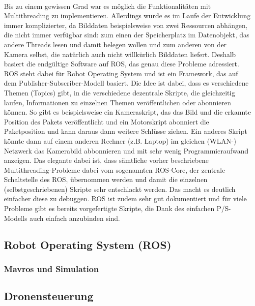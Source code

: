 \paragraph{}
Bis zu einem gewissen Grad war es möglich die Funktionalitäten mit Multithreading zu
implementieren. Allerdings wurde es im Laufe der Entwicklung immer komplizierter, da
Bilddaten beispielsweise von zwei Ressourcen abhängen, die nicht immer verfügbar
sind: zum einen der Speicherplatz im Datenobjekt, das andere Threads lesen und
damit belegen wollen und zum anderen von der Kamera selbst, die natürlich auch nicht
willkürlich Bilddaten liefert. Deshalb basiert die endgültige Software auf ROS, das
genau diese Probleme adressiert. ROS steht dabei für Robot Operating System und
ist ein Framework, das auf dem Publisher-Subscriber-Modell basiert. Die Idee ist
dabei, dass es verschiedene Themen (Topics) gibt, in die verschiedene dezentrale
Skripte, die gleichzeitig laufen, Informationen zu einzelnen Themen veröffentlichen
oder abonnieren können. So gibt es beispielsweise ein Kameraskript, das das Bild und
die erkannte Position des Pakets veröffentlicht und ein Motorskript abonniert die
Paketposition und kann daraus dann weitere Schlüsse ziehen. Ein anderes Skript
könnte dann auf einem anderen Rechner (z.B. Laptop) im gleichen (WLAN-) Netzwerk
das Kamerabild abbonnieren und mit sehr wenig Programmieraufwand anzeigen. Das
elegante dabei ist, dass sämtliche vorher beschriebene Multithreading-Probleme dabei
vom sogenannten ROS-Core, der zentrale Schaltstelle des ROS, übernommen
werden und damit die einzelnen (selbstgeschriebenen) Skripte sehr entschlackt
werden. Das macht es deutlich einfacher diese zu debuggen. ROS ist zudem sehr gut
dokumentiert und für viele Probleme gibt es bereits vorgefertigte Skripte, die Dank des
einfachen P/S-Modells auch einfach anzubinden sind.

\subsection{Robot Operating System (ROS)}
\subsubsection{Mavros und Simulation}
\subsection{Dronensteuerung}